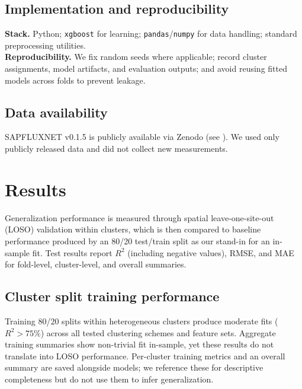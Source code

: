\documentclass[graybox]{svmult}
\begin{document}
\subsection{Implementation and reproducibility}
\label{subsec:repro}
\textbf{Stack.} Python; \texttt{xgboost} for learning; \texttt{pandas}/\texttt{numpy} for data handling; standard preprocessing utilities. \\
\textbf{Reproducibility.} We fix random seeds where applicable; record cluster assignments, model artifacts, and evaluation outputs; and avoid reusing fitted models across folds to prevent leakage.

\subsection{Data availability}
SAPFLUXNET v0.1.5 is publicly available via Zenodo (see \cite{poyatos_global_2021}). We used only publicly released data and did not collect new measurements.

\section{Results}
\label{sec:4}
Generalization performance is measured through spatial leave-one-site-out (LOSO) validation within clusters, which is then compared to baseline performance produced by an 80/20 test/train split as our stand-in for an in-sample fit. Test results report $R^2$ (including negative values), RMSE, and MAE for fold-level, cluster-level, and overall summaries.

\subsection{Cluster split training performance}
Training 80/20 splits within heterogeneous clusters produce moderate fits ($R^2 > 75\%$) across all tested clustering schemes and feature sets. Aggregate training summaries show non-trivial fit in-sample, yet these results do not translate into LOSO performance. Per-cluster training metrics and an overall summary are saved alongside models; we reference these for descriptive completeness but do not use them to infer generalization.
\end{document}
